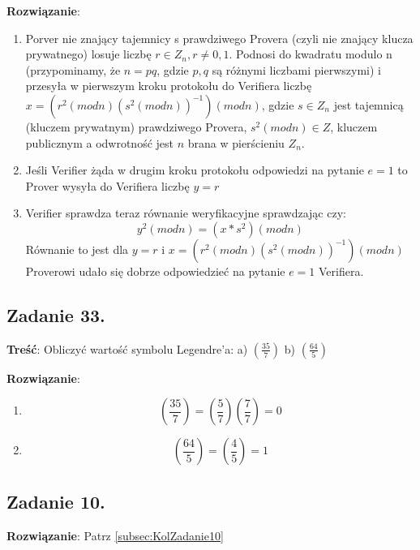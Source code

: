 \documentclass[a4paper,10pt, twocolumn]{article}
\begin{document}
\textbf{Rozwiązanie}: 
\begin{enumerate}
	\item Porver nie znający tajemnicy s prawdziwego Provera (czyli nie znający klucza prywatnego) losuje liczbę $r\in Z_n, r\neq 0,1$. Podnosi do kwadratu modulo n (przypominamy, że $n=pq$, gdzie $p,q$ są różnymi liczbami pierwszymi) i przesyła w pierwszym kroku protokołu do Verifiera liczbę $x=(r^2(modn){(s^2(modn))}^{-1})(modn)$, gdzie $s \in Z_n$ jest tajemnicą (kluczem prywatnym) prawdziwego Provera, $s^2(modn)\in Z$, kluczem publicznym a odwrotność jest $n$ brana w pierścieniu $Z_n$.
	\item Jeśli Verifier żąda w drugim kroku protokołu odpowiedzi na pytanie $e=1$ to Prover wysyła do Verifiera liczbę $y=r$
	\item Verifier sprawdza teraz równanie weryfikacyjne sprawdzając czy:
		\begin{equation*}
			y^2(modn)=(x*s^2)(modn)
		\end{equation*}
		Równanie to jest dla $y=r$ i $x=(r^2(modn){(s^2(modn))}^{-1})(modn)$
		Proverowi udało się dobrze odpowiedzieć na pytanie $e=1$ Verifiera.
\end{enumerate}

\subsection{Zadanie 33.}
\textbf{Treść}: Obliczyć wartość symbolu Legendre'a: a) $(\frac{35}{7})$ b) $(\frac{64}{5})$

\textbf{Rozwiązanie}:
\begin{enumerate}
	\item{
		\begin{equation*}
			(\frac{35}{7})=(\frac{5}{7})(\frac{7}{7})=0
		\end{equation*}
	}
	\item{
		\begin{equation*}
			(\frac{64}{5})=(\frac{4}{5})=1
		\end{equation*}
	}
\end{enumerate}

\subsection{Zadanie 10.}
\textbf{Rozwiązanie}: Patrz \ref{subsec:KolZadanie10}
\end{document}
